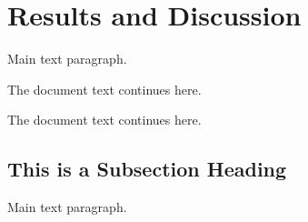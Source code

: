\section{Results and Discussion}


Main text paragraph.


The document text continues here.


The document text continues here.


\subsection{This is a Subsection Heading}


Main text paragraph.

